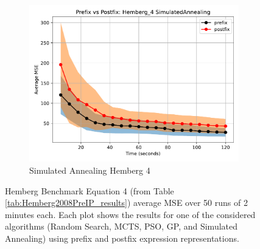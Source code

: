 \documentclass[12pt]{iopart}
\begin{document}
\begin{figure}
    \vspace{0.5cm}
    
    \begin{subfigure}[b]{0.4\textwidth}
        \includegraphics[width=\linewidth, keepaspectratio]{Hemberg_Benchmarks/PrePostHemberg_4SimulatedAnnealing.pdf}
        \caption{Simulated Annealing Hemberg 4}
        \label{subfig:hemberg_4_SA}
    \end{subfigure}
    
    \caption{Hemberg Benchmark Equation 4 (from Table \ref{tab:Hemberg2008PreIP_results}) average MSE over 50 runs of 2 minutes each. Each plot shows the results for one of the considered algorithms (Random Search, MCTS, PSO, GP, and Simulated Annealing) using prefix and postfix expression representations.}
    \label{fig:Hemberg_4_Benchmarks}
\end{figure}
\end{document}
